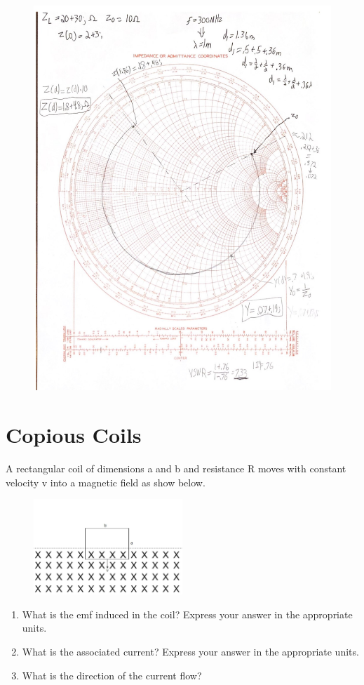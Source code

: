 \documentclass{article}
\begin{document}
\begin{figure}[H]
\begin{center}
    \includegraphics[width= 0.9
    \textwidth]{figures/Distance Solution.jpg}
\end{center}
\end{figure}

\newpage

\section{Copious Coils}
A rectangular coil of dimensions a and b and resistance R moves with constant velocity v into a magnetic field as show below.

\begin{figure}[H]
\begin{center}
    \includegraphics[width= 0.5\textwidth]{figures/square.jpg}
\end{center}
\end{figure}
\begin{enumerate}
    \item What is the emf induced in the coil? Express your answer in the appropriate units.
    \item What is the associated current? Express your answer in the appropriate units.
    \item What is the direction of the current flow?
\end{enumerate}
\end{document}
